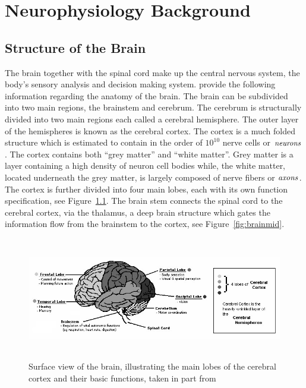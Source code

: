 \chapter{Neurophysiology Background}
\label{ch:neurobackgnd} 


\section{Structure of the Brain}
\label{sec:struct}

The brain together with the spinal cord make up the central nervous system, the body's sensory analysis and decision making system. \cite{Kandel_2002_PrinciplesNeuralSc,Sherwood_2001_cell2sys,Nunez_2006_ElecFieldsBrain} provide the following information regarding the anatomy of the brain. The brain can be subdivided into two main regions, the brainstem and cerebrum. The cerebrum is structurally divided into two main regions each called a cerebral hemisphere.  The outer layer of the hemispheres is known as the cerebral cortex. The cortex is a much folded structure which is estimated to contain in the order of $10^{10}$ nerve cells or $\it{neurons}$ \cite[Ch. 1]{Nunez_2006_ElecFieldsBrain}.  The cortex contains both ``grey matter'' and ``white matter''.  Grey matter is a layer containing a high density of neuron cell bodies while, the white matter, located underneath the grey matter, is largely composed of  nerve  fibers or $\it{axons}$.  The cortex is further divided into four main lobes, each with its own function specification, see Figure~\ref{fig:brainsurf}.  The brain stem connects the spinal cord to the cerebral cortex, via the thalamus, a deep brain structure which gates the information flow from the brainstem to the cortex, see Figure~\ref{fig:brainmid}.\\

\begin{figure} [hbt]
\centering
\includegraphics[height=2.1in]{figures/070108_brain_parts}
\caption{Surface view of the brain, illustrating the main lobes of the cerebral cortex and their basic functions, taken in part from \cite{corteximage} }
\label{fig:brainsurf}
\end{figure}

